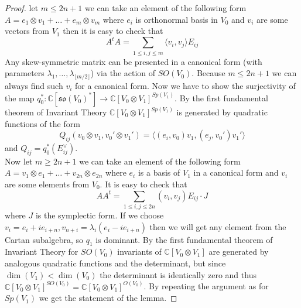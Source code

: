 \documentclass[12pt]{amsart}
\theoremstyle{definition}
\theoremstyle{remark}
\numberwithin{equation}{subsection}
\begin{document}
\begin{proof} let $m\le 2n+1$ we can take an element of the following form $A=e_1 \otimes v_1 + \dots +e_m \otimes v_m$ where $e_i$ is orthonormal basis in $V_0$ and $v_i$ are some vectors from $V_1$ then it is easy to check that 
\begin{equation}
   A^tA= \sum_{1\le i,j \le m} \langle v_i,v_j \rangle E_{ij} 
\end{equation}
Any skew-symmetric matrix can be presented in a canonical form (with parameters $\lambda_1,\dots, \lambda_{\lfloor m/2 \rfloor}$) via the action of $SO(V_0)$. Because $m\le 2n+1$ we can always find such $v_i$ for a canonical form. Now we have to show the surjectivity of the map $q_0^*\colon  \mathbb{C}[\mathfrak{so}(V_0)^*] \rightarrow \mathbb{C}[V_0 \otimes V_1]^{Sp(V_1)}$. By the first fundamental theorem of Invariant Theory $\mathbb{C}[V_0 \otimes V_1]^{Sp(V_1)}$ is generated by quadratic functions of the form
\begin{equation}
    Q_{ij}(v_0 \otimes v_1, v_0' \otimes v_1') = \langle (e_i,v_0) v_1, (e_j,v_0')v_1'\rangle
\end{equation}
and $Q_{ij}= q_0^*(E_{ij}^{\vee})$.\\
Now let $m\ge 2n+1$ we can take an element of the following form $A= v_1\otimes e_1 + \dots+ v_{2n}\otimes e_{2n}$ where $e_i$ is a basis of $V_1$ in a canonical form and $v_i$ are some elements from $V_0$. It is easy to check that
\begin{equation}
    AA^t = \sum_{1\le i,j \le 2n} (v_i,v_j) E_{ij} \cdot J
\end{equation}
where $J$ is the symplectic form. If we choose $v_i=e_i + ie_{i+n}, v_{n+i}=\lambda_i (e_i-ie_{i+n})$ then we will get any element from the Cartan subalgebra, so $q_1$ is dominant. By the first fundamental theorem of Invariant Theory for $SO(V_0)$ invariants of $\mathbb{C}[V_0 \otimes V_1]$ are generated by analogous quadratic functions and the determinant, but since $\dim(V_1) < \dim(V_0)$ the determinant is identically zero and thus $\mathbb{C}[V_0 \otimes V_1]^{SO(V_0)}=\mathbb{C}[V_0 \otimes V_1]^{O(V_0)}$. By repeating the argument as for $Sp(V_1)$ we get the statement of the lemma.
\end{proof}
\end{document}

